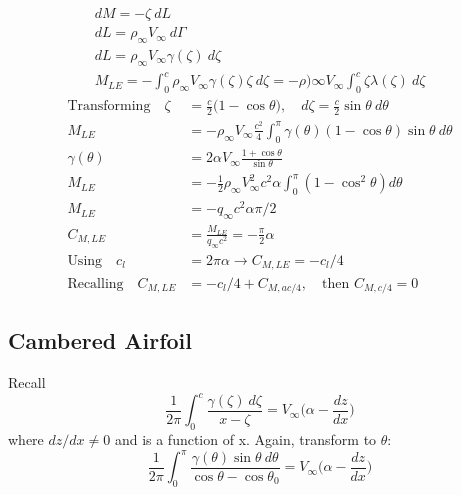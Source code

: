 \documentclass[draft=false, titlepage]{article}
\begin{document}
\begin{gather*}
    dM = -\zeta\ dL\\
    dL = \rho_\infty V_\infty\ d\Gamma\\
    dL = \rho_\infty V_\infty \gamma(\zeta)\ d\zeta\\
    M_{LE} = -\int_0^c \rho_\infty V_\infty \gamma(\zeta) \zeta\ d\zeta = -\rho)\infty V_\infty \int_0^c \zeta \lambda(\zeta)\ d\zeta
\end{gather*}
\begin{align*}
    \text{Transforming} \quad \zeta &= \frac{c}{2}\big(1-\cos\theta\big),\quad d\zeta = \frac{c}{2}\sin\theta\ d\theta\\
    M_{LE} &= -\rho_\infty V_\infty \frac{c^2}{4} \int_0^\pi \gamma(\theta)(1-\cos\theta) \sin\theta\ d\theta\\
    \gamma(\theta) &= 2\alpha V_\infty \frac{1+\cos\theta}{\sin\theta}\\
    M_{LE} &= -\frac{1}{2} \rho_\infty V_\infty^2 c^2\alpha \int_0^\pi (1-\cos^2\theta) d\theta\\
    M_{LE} &= -q_\infty c^2 \alpha\pi/2\\
    C_{M,LE} &= \frac{M_{LE}}{q_\infty c^2} = -\frac{\pi}{2}\alpha\\
    \text{Using} \quad c_l &= 2\pi \alpha \rightarrow C_{M,LE} = -c_l/4\\
    \text{Recalling} \quad C_{M,LE} &= -c_l/4 + C_{M,ac/4},\quad \text{then } \boxed{C_{M,c/4} = 0}
\end{align*}

\subsection{Cambered Airfoil}
Recall
\begin{equation*}
    \frac{1}{2\pi} \int_0^c \frac{\gamma(\zeta)\ d\zeta}{x-\zeta} = V_\infty \Big( \alpha - \frac{dz}{dx}\Big)
\end{equation*}
where $dz/dx \neq 0$ and is a function of x. Again, transform to $\theta$:
\begin{equation*}
    \frac{1}{2\pi} \int_0^\pi \frac{\gamma(\theta)\sin\theta\ d\theta}{\cos\theta - \cos\theta_0} = V_\infty \Big(\alpha - \frac{dz}{dx}\Big)
\end{equation*}
\end{document}
